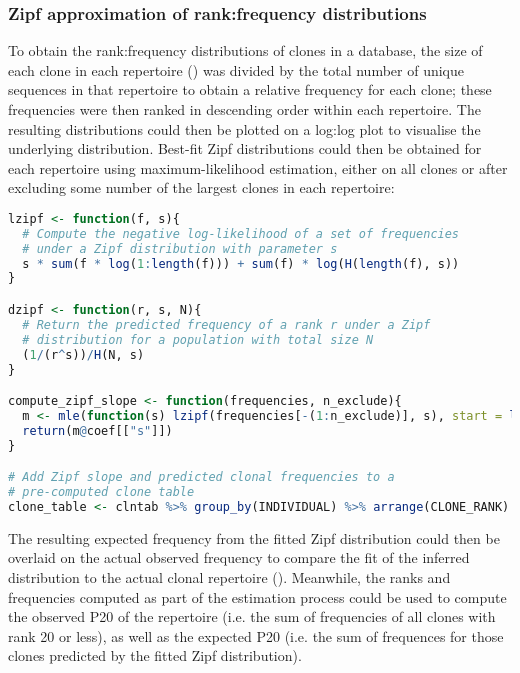 \subsubsection{Zipf approximation of rank:frequency distributions}
\label{sec:methods_comp_igdownstream_zipf}

To obtain the rank:frequency distributions of clones in a  database, the size of each clone in each repertoire () was divided by the total number of unique sequences in that repertoire to obtain a relative frequency for each clone; these frequencies were then ranked in descending order within each repertoire. The resulting distributions could then be plotted on a log:log plot to visualise the underlying distribution. Best-fit Zipf distributions could then be obtained for each repertoire using maximum-likelihood estimation, either on all clones or after excluding some number of the largest clones in each repertoire:

\begin{lstlisting}[language=R]
lzipf <- function(f, s){
  # Compute the negative log-likelihood of a set of frequencies
  # under a Zipf distribution with parameter s
  s * sum(f * log(1:length(f))) + sum(f) * log(H(length(f), s))
}

dzipf <- function(r, s, N){
  # Return the predicted frequency of a rank r under a Zipf 
  # distribution for a population with total size N
  (1/(r^s))/H(N, s)
}

compute_zipf_slope <- function(frequencies, n_exclude){
  m <- mle(function(s) lzipf(frequencies[-(1:n_exclude)], s), start = list(s=1))
  return(m@coef[["s"]])
}

# Add Zipf slope and predicted clonal frequencies to a
# pre-computed clone table
clone_table <- clntab %>% group_by(INDIVIDUAL) %>% arrange(CLONE_RANK) %>% mutate(S = compute_zipf_slope(CLONE_SIZE, n_exclude), EXP_FREQUENCY = dzipf(CLONE_RANK, S, n()), EXP_SIZE = sum(CLONE_SIZE) * EXP_FREQUENCY))
\end{lstlisting}

\noindent The resulting expected frequency from the fitted Zipf distribution could then be overlaid on the actual observed frequency to compare the fit of the inferred distribution to the actual clonal repertoire (). Meanwhile, the ranks and frequencies computed as part of the estimation process could be used to compute the observed P20 of the repertoire (i.e. the sum of frequencies of all clones with rank 20 or less), as well as the expected P20 (i.e. the sum of frequences for those clones predicted by the fitted Zipf distribution).


